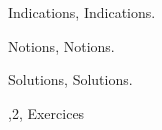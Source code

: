 %
\unless\ifLD@Inferno@Master@
	\eject
	\Chapter Indications, Indications.

	\LD@Exo@Indication@Display

	\Chapter Notions, Notions.

	\LD@Exo@Notion@Display

	\Chapter Solutions, Solutions.

	\LD@Exo@Sol@Display
\fi
\LD@dimenb=1cm\relax
\bye
	\LD@Loop@For{},2\WithSeparator ,%
\medskip\noindent
\the\LD@Exo@Total\LD@Space Exercices
\bye